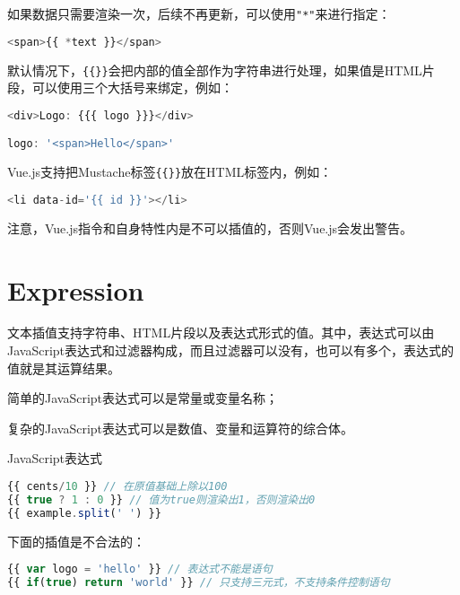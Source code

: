 如果数据只需要渲染一次，后续不再更新，可以使用\texttt{"*"}来进行指定：

\begin{lstlisting}[language=JavaScript]
<span>{{ *text }}</span>
\end{lstlisting}

默认情况下，\texttt{\{\{\}\}}会把内部的值全部作为字符串进行处理，如果值是HTML片段，可以使用三个大括号来绑定，例如：


\begin{lstlisting}[language=JavaScript]
<div>Logo: {{{ logo }}}</div>

logo: '<span>Hello</span>'
\end{lstlisting}

Vue.js支持把Mustache标签\texttt{\{\{\}\}}放在HTML标签内，例如：

\begin{lstlisting}[language=JavaScript]
<li data-id='{{ id }}'></li>
\end{lstlisting}


注意，Vue.js指令和自身特性内是不可以插值的，否则Vue.js会发出警告。

\section{Expression}

文本插值支持字符串、HTML片段以及表达式形式的值。其中，表达式可以由JavaScript表达式和过滤器构成，而且过滤器可以没有，也可以有多个，表达式的值就是其运算结果。

\begin{compactitem}
\item 简单的JavaScript表达式可以是常量或变量名称；
\item 复杂的JavaScript表达式可以是数值、变量和运算符的综合体。
\end{compactitem}


\begin{example}
JavaScript表达式
\begin{lstlisting}[language=JavaScript]
{{ cents/10 }} // 在原值基础上除以100
{{ true ? 1 : 0 }} // 值为true则渲染出1，否则渲染出0
{{ example.split(' ') }}
\end{lstlisting}
\end{example}


下面的插值是不合法的：

\begin{lstlisting}[language=JavaScript]
{{ var logo = 'hello' }} // 表达式不能是语句
{{ if(true) return 'world' }} // 只支持三元式，不支持条件控制语句
\end{lstlisting}

